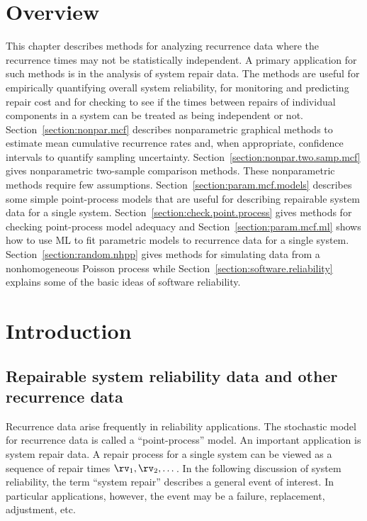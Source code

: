 \section*{Overview}
This chapter describes methods for analyzing recurrence data where
the recurrence times may not be  statistically
independent.  A primary application for such methods is in the
analysis of system repair data. The methods are useful for
empirically quantifying overall system reliability, for monitoring
and predicting repair cost and for checking to see if the times
between repairs of individual components in a system can be treated
as being independent or not.  Section~\ref{section:nonpar.mcf}
describes nonparametric graphical methods to estimate mean
cumulative recurrence rates and, when appropriate, confidence
intervals to quantify sampling
uncertainty. Section~\ref{section:nonpar.two.samp.mcf} gives
nonparametric two-sample comparison methods. These nonparametric
methods require few assumptions.
Section~\ref{section:param.mcf.models} describes some simple
point-process models that are useful for describing repairable
system data for a single
system. Section~\ref{section:check.point.process} gives methods for
checking point-process model adequacy and
Section~\ref{section:param.mcf.ml} shows how to use ML to fit
parametric models to recurrence data for a single system.
Section~\ref{section:random.nhpp} gives methods for simulating
data from a nonhomogeneous Poisson process while
Section~\ref{section:software.reliability} explains some of the
basic ideas of software reliability.


\section{Introduction}
\subsection{Repairable system reliability data
and other recurrence data}

Recurrence data arise frequently in reliability applications.  The
stochastic model for recurrence data is called a ``point-process''
model. An important application is system repair data. A repair
process for a single system can be viewed as a sequence of repair
times $\rv_{1},
\rv_{2}, \dots $. In the following discussion of system reliability,
the term ``system repair'' describes a general event of interest. In
particular applications, however, the event may be a failure,
replacement, adjustment, etc.

